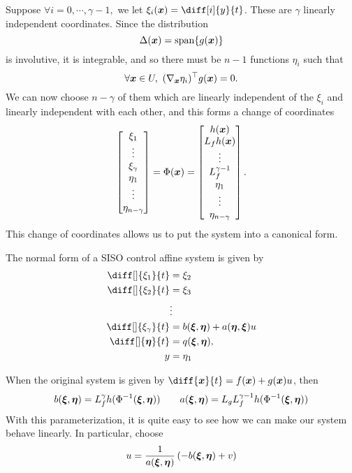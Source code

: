 Suppose $\forall i=0,\cdots,\gamma-1,$ we let $\xi_i(\bs{x}) = \diff[i]{y}{t}$.
These are $\gamma$ linearly independent coordinates. Since the distribution \[
	\Delta(\boldsymbol{x}) = \text{span}\{g(\boldsymbol{x})\}
\]
is involutive, it is integrable, and so there must be $n-1$ functions $\eta_i$
such that \[
	\forall \bs{x}\in U,\ (\nabla_{\bs{x}}\eta_i)^\top g(\bs{x}) = 0.
\]
We can now choose $n-\gamma$ of them which are linearly independent of the
$\xi_i$ and linearly independent with each other, and this forms a change of
coordinates \[
	\begin{bmatrix}
		\xi_1\\
		\vdots\\
		\xi_{\gamma}\\
		\eta_1\\
		\vdots\\
		\eta_{n-\gamma}
	\end{bmatrix} = \Phi(\boldsymbol{x}) = \begin{bmatrix}
		h(\boldsymbol{x})\\
		L_fh(\boldsymbol{x})\\
		\vdots\\
		L_f^{\gamma-1}\\
		\eta_1\\
		\vdots\\
		\eta_{n-\gamma}
	\end{bmatrix}.
\]
This change of coordinates allows us to put the system into a canonical form.
\begin{definition}
	The normal form of a SISO control affine system is given by \[
		\begin{aligned}
			\diff[]{\xi_1}{t} &= \xi_2\\
			\diff[]{\xi_2}{t} &= \xi_3\\
			&\vdots\\
			\diff[]{\xi_{\gamma}}{t} &= b(\bs{\xi}, \bs{\eta}) + a(\bs{\eta},
			\bs{\xi})u\\
			\diff[]{\bs{\eta}}{t} &= q(\bs{\xi}, \bs{\eta}),\\
			y &= \eta_1
		\end{aligned}
	\]
	\label{defn:normal-form-siso}
\end{definition}
When the original system is given by $\diff{\bs{x}}{t} = f(\bs{x})+g(\bs{x})u$, then
\[
	b(\boldsymbol{\xi},\boldsymbol{\eta}) = L_f^\gamma h(\Phi^{-1}(\boldsymbol{\xi}, \boldsymbol{\eta})) \qquad
	a(\boldsymbol{\xi}, \boldsymbol{\eta}) = L_gL_f^{\gamma-1} h(\Phi^{-1}(\boldsymbol{\xi}, \boldsymbol{\eta}))
\]
With this parameterization, it is quite easy to see how we can make our system
behave linearly. In particular, choose \[
	u = \frac{1}{a(\boldsymbol{\xi}, \boldsymbol{\eta})}\left(-b(\boldsymbol{\xi}, \boldsymbol{\eta}) +
	v\right)
\]
